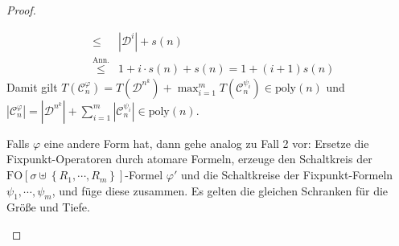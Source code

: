 \begin{proof}
\begin{casenv}
\begin{description}
\begin{eqnarray*}
 & \leqslant & \left|\mathcal{D}^{i}\right|+s\left(n\right)\\
 & \overset{\mathrm{Ann.}}{\leqslant} & 1+i\cdot s\left(n\right)+s\left(n\right)=1+\left(i+1\right)s\left(n\right)
\end{eqnarray*}
Damit gilt $T\left(\mathcal{C}_{n}^{\varphi}\right)=T\left(\mathcal{D}^{n^{k}}\right)+\max_{i=1}^{m}T\left(\mathcal{C}_{n}^{\psi_{i}}\right)\in\mathrm{poly}\left(n\right)$
und $\left|\mathcal{C}_{n}^{\varphi}\right|=\left|\mathcal{D}^{n^{k}}\right|+\sum_{i=1}^{m}\left|\mathcal{C}_{n}^{\psi_{i}}\right|\in\mathrm{poly}\left(n\right)$.
\end{description}
\item Falls $\varphi$ eine andere Form hat, dann gehe analog zu Fall 2
vor: Ersetze die Fixpunkt-Operatoren durch atomare Formeln, erzeuge
den Schaltkreis der $\mathrm{FO}\left[\sigma\uplus\left\{ R_{1},\cdots,R_{m}\right\} \right]$-Formel
$\varphi'$ und die Schaltkreise der Fixpunkt-Formeln $\psi_{1},\cdots,\psi_{m}$,
und füge diese zusammen. Es gelten die gleichen Schranken für die
Größe und Tiefe.
\end{casenv}
\end{proof}

